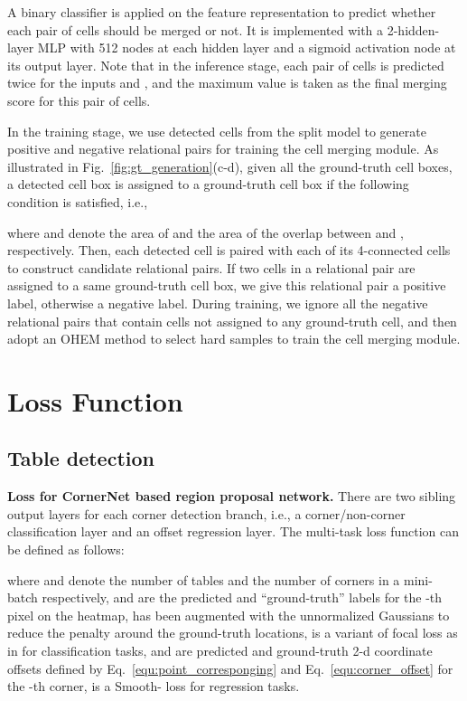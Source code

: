 \documentclass[final,3p,times,twocolumn]{elsarticle}
\begin{document}
A binary classifier is applied on the feature representation to predict whether each pair of cells should be merged or not. It is implemented with a 2-hidden-layer MLP with 512 nodes at each hidden layer and a sigmoid activation node at its output layer. Note that in the inference stage, each pair of cells is predicted twice for the inputs  and , and the maximum value is taken as the final merging score for this pair of cells. 

In the training stage, we use detected cells from the split model to generate positive and negative relational pairs for training the cell merging module. As illustrated in Fig.~\ref{fig:gt_generation}(c-d), given all the ground-truth cell boxes, a detected cell box  is assigned to a ground-truth cell box  if the following condition is satisfied, i.e.,

where  and  denote the area of  and the area of the overlap between  and , respectively. Then, each detected cell is paired with each of its 4-connected cells to construct candidate relational pairs. If two cells in a relational pair are assigned to a same ground-truth cell box, we give this relational pair a positive label, otherwise a negative label. During training, we ignore all the negative relational pairs that contain cells not assigned to any ground-truth cell, and then adopt an OHEM method to select hard samples to train the cell merging module.

\section{Loss Function}
\label{subsec:loss_func}
\subsection{Table detection}
\textbf{Loss for CornerNet based region proposal network.} 
There are two sibling output layers for each corner detection branch, i.e., a corner/non-corner classification layer and an offset regression layer. The multi-task loss function can be defined as follows:

where  and  denote the number of tables and the number of corners in a mini-batch respectively,  and  are the predicted and “ground-truth” labels for the -th pixel on the heatmap,  has been augmented with the unnormalized Gaussians to reduce the penalty around the ground-truth locations,  is a variant of focal loss as in \cite{law2018cornernet} for classification tasks,  and  are predicted and ground-truth 2-d coordinate offsets defined by Eq.~\ref{equ:point_corresponging} and Eq.~\ref{equ:corner_offset} for the -th corner,  is a Smooth- loss\cite{ren2015faster} for regression tasks.
\end{document}
